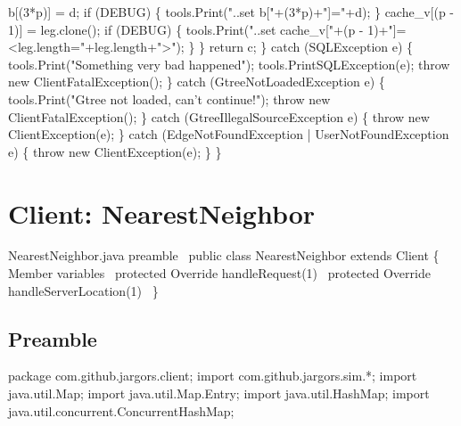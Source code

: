       b[(3*p)] = d;
      if (DEBUG) \{
        tools.Print("..set b["+(3*p)+"]="+d);
      \}
      cache_v[(p - 1)] = leg.clone();
      if (DEBUG) \{
        tools.Print("..set cache_v["+(p - 1)+"]=<leg.length="+leg.length+">");
      \}
    \}
    return c;
  \} catch (SQLException e) \{
    tools.Print("Something very bad happened");
    tools.PrintSQLException(e);
    throw new ClientFatalException();
  \} catch (GtreeNotLoadedException e) \{
    tools.Print("Gtree not loaded, can't continue!");
    throw new ClientFatalException();
  \} catch (GtreeIllegalSourceException e) \{
    throw new ClientException(e);
  \} catch (EdgeNotFoundException | UserNotFoundException e) \{
    throw new ClientException(e);
  \}
\}
\nwendcode{}\nwdocspar

\appendix

\nwenddocs{}\chapter{Client: NearestNeighbor}
\label{NearestNeighbor}

\nwenddocs{}\endmoddef\nwstartdeflinemarkup\nwenddeflinemarkup
\LA{}NearestNeighbor.java preamble~{\nwtagstyle{}}\RA{}
public class NearestNeighbor extends Client \{
  \LA{}Member variables~{\nwtagstyle{}}\RA{}
  protected \LA{}Override handleRequest(1)~{\nwtagstyle{}}\RA{}
  protected \LA{}Override handleServerLocation(1)~{\nwtagstyle{}}\RA{}
\}
\nwendcode{}\nwdocspar

\section{Preamble}
\label{NearestNeighbor: preamble}

\nwenddocs{}\endmoddef\nwstartdeflinemarkup{}\nwenddeflinemarkup
package com.github.jargors.client;
import com.github.jargors.sim.*;
import java.util.Map;
import java.util.Map.Entry;
import java.util.HashMap;
import java.util.concurrent.ConcurrentHashMap;
\nwendcode{}\nwdocspar

